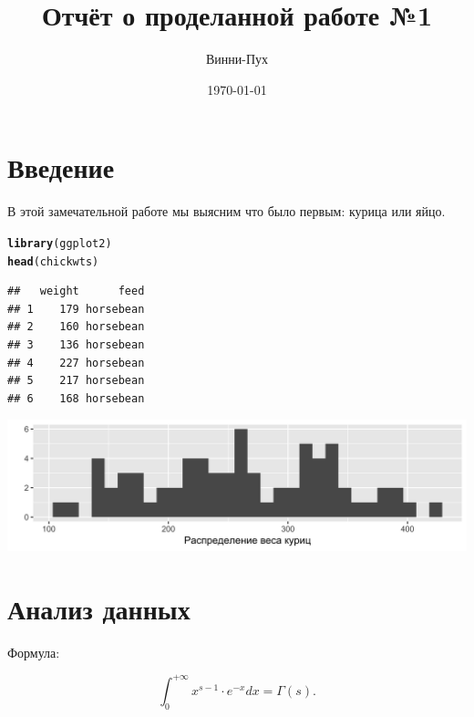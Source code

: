 \documentclass{article}\usepackage[]{graphicx}\usepackage[]{color}
\title{Отчёт о проделанной работе №1}
\author{Винни-Пух}
\date{\today}
\makeatletter
\def\maxwidth{ %
  \ifdim\Gin@nat@width>\linewidth
    \linewidth
  \else
    \Gin@nat@width
  \fi
}
\newcommand{\hlstd}[1]{\textcolor[rgb]{0.345,0.345,0.345}{#1}}%
\newcommand{\hlkwd}[1]{\textcolor[rgb]{0.737,0.353,0.396}{\textbf{#1}}}%
\newenvironment{kframe}{%
 \def\at@end@of@kframe{}%
 \ifinner\ifhmode%
  \def\at@end@of@kframe{\end{minipage}}%
  \begin{minipage}{\columnwidth}%
 \fi\fi%
 \def\FrameCommand##1{\hskip\@totalleftmargin \hskip-\fboxsep
 \colorbox{shadecolor}{##1}\hskip-\fboxsep
     \hskip-\linewidth \hskip-\@totalleftmargin \hskip\columnwidth}%
 \MakeFramed {\advance\hsize-\width
   \@totalleftmargin\z@ \linewidth\hsize
   \@setminipage}}%
 {\par\unskip\endMakeFramed%
 \at@end@of@kframe}
\newenvironment{knitrout}{}{} %
\makeatother
\begin{document}
\maketitle




\section{Введение}

В этой замечательной работе мы выясним что было первым: курица или яйцо. 

\begin{knitrout}
\color{fgcolor}\begin{kframe}
\begin{alltt}
\hlkwd{library}\hlstd{(ggplot2)}
\hlkwd{head}\hlstd{(chickwts)}
\end{alltt}
\begin{verbatim}
##   weight      feed
## 1    179 horsebean
## 2    160 horsebean
## 3    136 horsebean
## 4    227 horsebean
## 5    217 horsebean
## 6    168 horsebean
\end{verbatim}
\end{kframe}
\end{knitrout}

\begin{knitrout}
\color{fgcolor}

{\centering \includegraphics[width=\maxwidth]{figure/unnamed-chunk-3-1} 

}



\end{knitrout}

\section{Анализ данных}

Формула: 

\[ \int_{0}^{+\infty} x^{s-1} \cdot e^{-x} dx = \Gamma(s). \]
\end{document}

